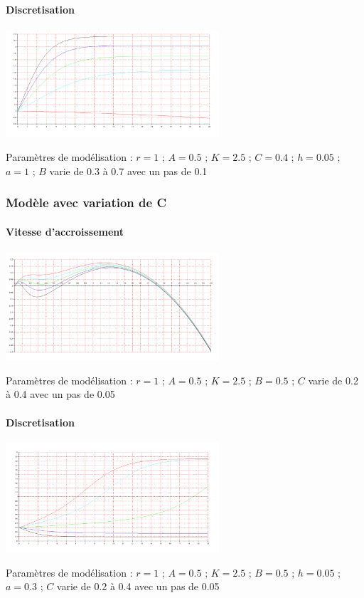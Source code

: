 \documentclass{article}
\begin{document}
\paragraph{Discretisation}
\begin{center}
\includegraphics[width=300px]{img/part2/TrajB.png}
\end{center}
Paramètres de modélisation : $r=1$ ; $A=0.5$ ; $K=2.5$ ; $C=0.4$ ; $h=0.05$ ; $a=1$ ; $B$ varie de 0.3 à 0.7 avec un pas de 0.1
\paragraph{}

\subsubsection{Modèle avec variation de C}

\paragraph{Vitesse d'accroissement}
\begin{center}
\includegraphics[width=300px]{img/part2/logC.png}
\end{center}
Paramètres de modélisation :  $r=1$ ; $A=0.5$ ; $K=2.5$ ; $B=0.5$ ; $C$ varie de 0.2 à 0.4 avec un pas de 0.05
\paragraph{}


\paragraph{Discretisation}
\begin{center}
\includegraphics[width=300px]{img/part2/TrajC.png}
\end{center}
Paramètres de modélisation :  $r=1$ ; $A=0.5$ ; $K=2.5$ ; $B=0.5$ ; $h=0.05$ ; $a=0.3$ ; $C$ varie de 0.2 à 0.4 avec un pas de 0.05
\end{document}
